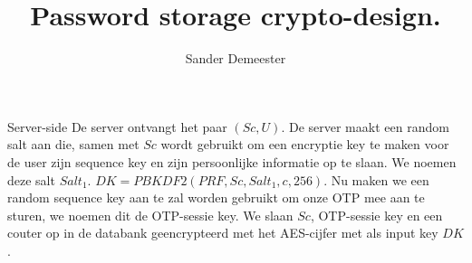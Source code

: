 \documentclass[10pt,a4paper]{report}
\author{Sander Demeester}
\title{Password storage crypto-design.}
\begin{document}
\begin{subsection}{Server-side}
De server ontvangt het paar $(Sc,U)$. De server maakt een random salt aan die, samen met $Sc$ wordt gebruikt om een encryptie key te maken voor de user zijn sequence key en zijn persoonlijke informatie op te slaan. We noemen deze salt $Salt_{1}$. 
$DK = PBKDF2(PRF, Sc,Salt_{1},c,256)$. Nu maken we een random sequence key aan te zal worden gebruikt om onze OTP mee aan te sturen, we noemen dit de OTP-sessie key. We slaan $Sc$, OTP-sessie key en een couter op in de databank geencrypteerd met het AES-cijfer met als input key $DK$. 
\end{subsection}
\end{document}
